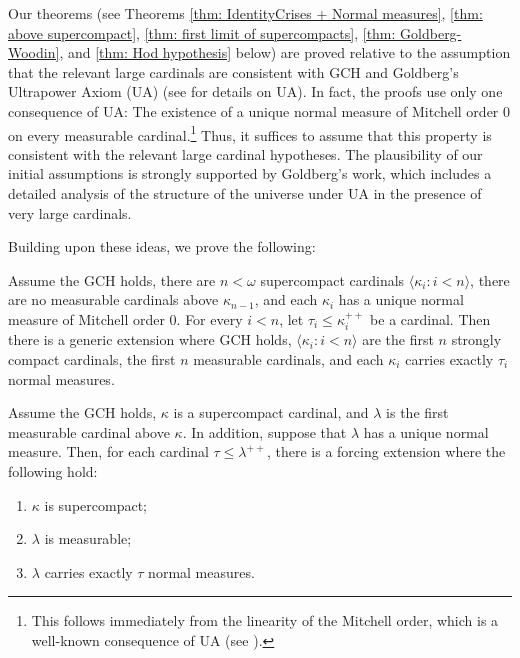 \documentclass[11pt]{amsart}
\newenvironment{manualtheorem}[1]{%
  \IfBlankTF{#1}
    {\renewcommand{\themanualtheoreminner}{\unskip}}
    {\renewcommand\themanualtheoreminner{#1}}%
  \manualtheoreminner
}{\endmanualtheoreminner}
\theoremstyle{definition}
\theoremstyle{remark}
\newcommand\<{{<}}
\begin{document}
\smallskip

Our theorems (see Theorems \ref{thm: IdentityCrises + Normal measures}, \ref{thm: above supercompact}, \ref{thm: first limit of supercompacts}, \ref{thm: Goldberg-Woodin}, and \ref{thm: Hod hypothesis} below) are proved relative to the assumption that the relevant large cardinals are consistent with GCH and Goldberg’s Ultrapower Axiom (UA) (see \cite{goldbergtheultrapoweraxiom} for details on UA). In fact, the proofs use only one consequence of UA: The existence of a unique normal measure of Mitchell order $0$ on every measurable cardinal.\footnote{This follows immediately from the linearity of the Mitchell order, which is a well-known consequence of UA (see \cite[Theorem 2.3.11]{goldbergtheultrapoweraxiom}).}  Thus, it suffices to assume that this property is consistent with the relevant large cardinal hypotheses. The plausibility of our initial assumptions is strongly supported by Goldberg’s work, which includes a detailed analysis of the structure of the universe under UA in the presence of very large cardinals.
\smallskip

Building upon these ideas, we prove the following:

\begin{manualtheorem}{\ref{thm: IdentityCrises + Normal measures}}
    Assume the $\mathrm{GCH}$ holds, there are $n<\omega$ supercompact cardinals $\langle \kappa_i: i<n\rangle$, there are no measurable cardinals above $\kappa_{n-1}$,  and each $\kappa_i$ has a unique normal measure of Mitchell order $0$. For every $i<n$, let $\tau_i\leq\kappa^{++}_i$ be a cardinal. Then there is a generic extension where {\rm{GCH}} holds, $\langle \kappa_i: i<n\rangle$ are the first $n$ strongly compact cardinals, the first $n$ measurable cardinals,  and each $\kappa_i$ carries exactly $\tau_i$ normal measures.
\end{manualtheorem}



\begin{manualtheorem}{\ref{thm: above supercompact}}
    Assume the $\mathrm{GCH}$ holds,  $\kappa$ is a supercompact cardinal, and $\lambda$ is the first measurable cardinal above $\kappa$. In addition, suppose that $\lambda$ has a unique normal measure. Then, for each cardinal $\tau\leq \lambda^{++}$, there is a forcing extension  where the following hold:
    \begin{enumerate}
        \item  $\kappa$ is supercompact;
        \item  $\lambda$ is measurable;
        \item $\lambda$ carries exactly $\tau$ normal measures.
    \end{enumerate}
\end{manualtheorem} 
\end{document}
